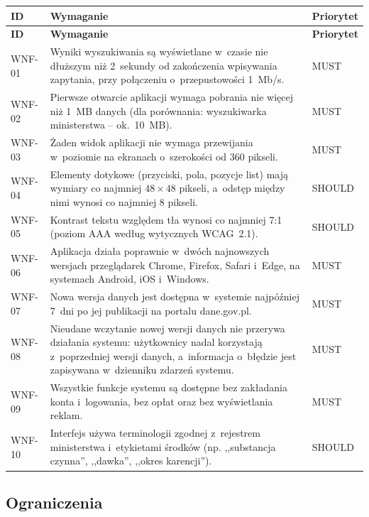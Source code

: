 \begingroup
\small
\begin{longtable}{|p{1.4cm}|p{11.4cm}|p{1.6cm}|}
\hline
\textbf{ID} & \textbf{Wymaganie} & \textbf{Priorytet} \\
\hline
\endfirsthead
\hline
\textbf{ID} & \textbf{Wymaganie} & \textbf{Priorytet} \\
\hline
\endhead
WNF-01 & Wyniki wyszukiwania są wyświetlane w~czasie nie dłuższym niż
2~sekundy od zakończenia wpisywania zapytania, przy połączeniu
o~przepustowości 1~Mb/s. & MUST \\
\hline
WNF-02 & Pierwsze otwarcie aplikacji wymaga pobrania nie więcej niż 1~MB
danych (dla porównania: wyszukiwarka ministerstwa -- ok.~10~MB). & MUST \\
\hline
WNF-03 & Żaden widok aplikacji nie wymaga przewijania w~poziomie na ekranach
o~szerokości od 360 pikseli. & MUST \\
\hline
WNF-04 & Elementy dotykowe (przyciski, pola, pozycje list) mają wymiary co
najmniej $48 \times 48$ pikseli, a~odstęp między nimi wynosi co najmniej
8 pikseli. & SHOULD \\
\hline
WNF-05 & Kontrast tekstu względem tła wynosi co najmniej 7:1 (poziom AAA
według wytycznych WCAG~2.1). & SHOULD \\
\hline
WNF-06 & Aplikacja działa poprawnie w~dwóch najnowszych wersjach przeglądarek
Chrome, Firefox, Safari i~Edge, na systemach Android, iOS i~Windows. & MUST \\
\hline
WNF-07 & Nowa wersja danych jest dostępna w~systemie najpóźniej 7~dni po jej
publikacji na portalu dane.gov.pl. & MUST \\
\hline
WNF-08 & Nieudane wczytanie nowej wersji danych nie przerywa działania
systemu: użytkownicy nadal korzystają z~poprzedniej wersji danych, a~informacja
o~błędzie jest zapisywana w~dzienniku zdarzeń systemu. & MUST \\
\hline
WNF-09 & Wszystkie funkcje systemu są dostępne bez zakładania konta
i~logowania, bez opłat oraz bez wyświetlania reklam. & MUST \\
\hline
WNF-10 & Interfejs używa terminologii zgodnej z~rejestrem ministerstwa
i~etykietami środków (np. ,,substancja czynna'', ,,dawka'', ,,okres
karencji''). & SHOULD \\
\hline
\end{longtable}
\endgroup

\subsection{Ograniczenia}

